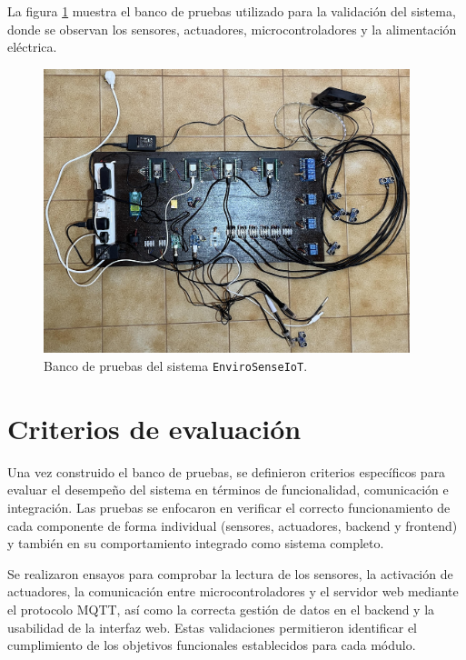 La figura \ref{fig:banco_pruebas} muestra el banco de pruebas utilizado para la
validación del sistema, donde se observan los sensores, actuadores,
microcontroladores y la alimentación eléctrica.

\begin{figure}[H]
    \centering
    \includegraphics[width=0.95\textwidth]{Images/36_prototipo.jpeg}
    \caption[Banco de pruebas del sistema EnviroSenseIoT]{Banco de pruebas del sistema \texttt{EnviroSenseIoT}.}
    \label{fig:banco_pruebas}
\end{figure}

\section{Criterios de evaluación}

Una vez construido el banco de pruebas, se definieron criterios específicos
para evaluar el desempeño del sistema en términos de funcionalidad,
comunicación e integración. Las pruebas se enfocaron en verificar el correcto
funcionamiento de cada componente de forma individual (sensores, actuadores,
backend y frontend) y también en su comportamiento integrado como sistema
completo.

Se realizaron ensayos para comprobar la lectura de los sensores, la activación
de actuadores, la comunicación entre microcontroladores y el servidor web
mediante el protocolo MQTT, así como la correcta gestión de datos en el backend
y la usabilidad de la interfaz web. Estas validaciones permitieron identificar
el cumplimiento de los objetivos funcionales establecidos para cada módulo.

